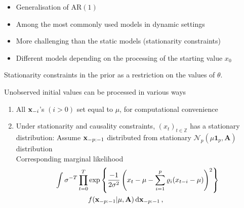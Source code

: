\begin{slide}
\pause
\begin{itemize}
\item Generalisation of AR$(1)$
\item Among the most commonly used models in dynamic settings
\item More challenging than the static models (stationarity constraints)
\item Different models depending on the processing of the starting value $x_0$
\end{itemize}

\end{slide}\begin{slide}

Stationarity constraints in the prior as a restriction
on the values of $\theta$. 

\begin{theorem}
{}
\end{theorem}

\end{slide}\begin{slide}

Unobserved initial values can be processed in various ways
\begin{enumerate} 
\item All $\mathbf{x}_{-i}$'s $(i>0)$ set equal to $\mu$, for computational convenience 
\pause
\item Under stationarity and causality constraints, 
$(x_t)_{t\in\mathbb{Z}}$ has a stationary distribution: Assume $\mathbf{x}_{-p:-1}$ distributed from
stationary $\mathscr{N}_p(\mu{\mathbf 1}_p,\mathbf{A})$ distribution\\ Corresponding
marginal likelihood
\footnotesize\begin{align*}
\int \sigma^{-T} \prod_{t=0}^T &\exp\left\{\frac{-1}{2\sigma^2}\left(x_t-\mu - \sum_{i=1}^p \varrho_i (x_{t-i}-\mu)
\right)^2 \right\}\\
&f(\mathbf{x}_{-p:-1}|\mu,\mathbf{A})\,\text{d}\mathbf{x}_{-p:-1}\,,
\end{align*}\normalsize
\end{enumerate}

\end{slide}\begin{slide}


\end{slide}
